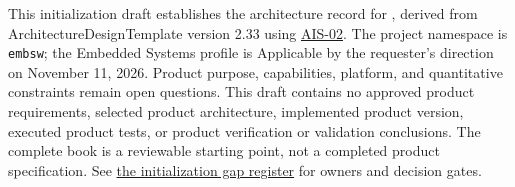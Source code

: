 This initialization draft establishes the architecture record for
\ProjectName, derived from ArchitectureDesignTemplate version 2.33 using
\hyperref[Skill:AIS-02]{AIS-02}. The project namespace is \texttt{embsw}; the
Embedded Systems profile is Applicable by the requester's direction on
November 11, 2026. Product purpose, capabilities, platform, and quantitative
constraints remain open questions. This draft contains no approved product
requirements, selected product architecture, implemented product version,
executed product tests, or product verification or validation conclusions.
The complete book is a reviewable starting point, not a completed product
specification. See \hyperref[Section:InitializationGaps]{the initialization gap
register} for owners and decision gates.
